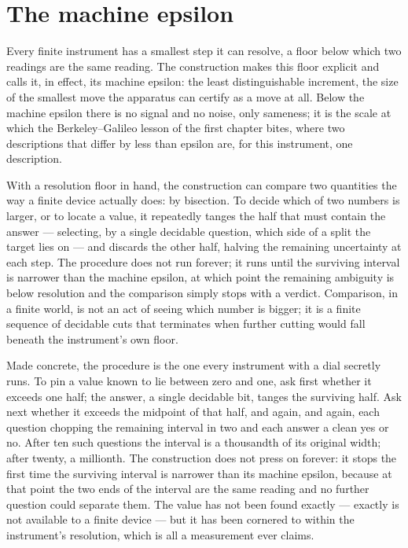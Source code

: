 \section{The machine epsilon}
\label{se:the-machine-epsilon}

Every finite instrument has a smallest step it can resolve, a floor below which two readings are the
same reading. The construction makes this floor explicit and calls it, in effect, its machine epsilon:
the least distinguishable increment, the size of the smallest move the apparatus can certify as a
move at all. Below the machine epsilon there is no signal and no noise, only sameness; it is the scale
at which the Berkeley--Galileo lesson of the first chapter bites, where two descriptions that differ
by less than epsilon are, for this instrument, one description.

With a resolution floor in hand, the construction can compare two quantities the way a finite device
actually does: by bisection. To decide which of two numbers is larger, or to locate a value, it
repeatedly tanges the half that must contain the answer --- selecting, by a single decidable question,
which side of a split the target lies on --- and discards the other half, halving the remaining
uncertainty at each step. The procedure does not run forever; it runs until the surviving interval is
narrower than the machine epsilon, at which point the remaining ambiguity is below resolution and the
comparison simply stops with a verdict. Comparison, in a finite world, is not an act of seeing which
number is bigger; it is a finite sequence of decidable cuts that terminates when further cutting would
fall beneath the instrument's own floor.

Made concrete, the procedure is the one every instrument with a dial secretly runs. To pin a value
known to lie between zero and one, ask first whether it exceeds one half; the answer, a single
decidable bit, tanges the surviving half. Ask next whether it exceeds the midpoint of that half, and
again, and again, each question chopping the remaining interval in two and each answer a clean yes or
no. After ten such questions the interval is a thousandth of its original width; after twenty, a
millionth. The construction does not press on forever: it stops the first time the surviving interval
is narrower than its machine epsilon, because at that point the two ends of the interval are the same
reading and no further question could separate them. The value has not been found exactly --- exactly
is not available to a finite device --- but it has been cornered to within the instrument's resolution,
which is all a measurement ever claims.

